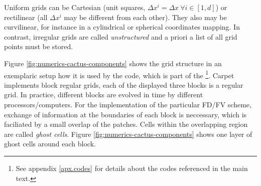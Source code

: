 Uniform grids can be Cartesian (unit squares, $\Delta x^i=\Delta x~\forall i\in[1,d]$)
or rectilinear (all $\Delta x^i$ may be different from each other). They also may be
curvilinear, for instance in a cylindrical or spherical coordinates mapping.
In contrast, irregular grids are called \emph{unstructured} and a priori a list of all
grid points must be stored.

Figure \ref{fig:numerics-cactus-components} shows the grid structure in an exemplaric setup
how it is used by the  code, which is part of the 
\footnote{See appendix \vref{apx.codes} for details about the codes referenced in the main text.}.
Carpet implements block regular grids, \ie each of the displayed three blocks is a regular grid.
In practice, different blocks are evolved in time by different processors/computers.
For the implementation of the particular FD/FV scheme, exchange of information at the boundaries
of each block is neccessary, which is faciliated by a small overlap of the patches. Cells within
the overlapping region are called \emph{ghost cells}. Figure \ref{fig:numerics-cactus-components}
shows one layer of ghost cells around each block.


